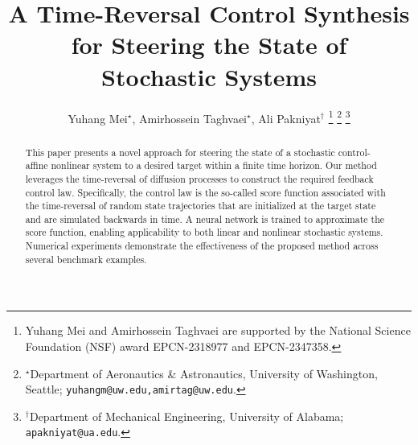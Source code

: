 \documentclass[letterpaper, 10 pt, conference]{ieeeconf}  %
\title{\LARGE \bf A Time-Reversal Control Synthesis for Steering the State of \\Stochastic Systems
}
\author{Yuhang Mei$^{\star}$, Amirhossein Taghvaei$^{\star}$, Ali Pakniyat$^{\dagger}$
 \thanks{Yuhang Mei and Amirhossein Taghvaei are supported by the National Science Foundation (NSF) award EPCN-2318977 and EPCN-2347358.}
     \thanks{$^\star$Department of Aeronautics \& Astronautics, University of Washington, Seattle; {\tt\small yuhangm@uw.edu,amirtag@uw.edu}.}   
	\thanks{$^\dagger$Department of Mechanical Engineering,
University of Alabama; {\tt\small apakniyat@ua.edu}.}
}
\begin{document}
	
	
	
      \maketitle
	 \thispagestyle{empty}
	 \pagestyle{empty}
	
	
    
        



        
	 \begin{abstract}
This paper presents a novel approach for steering the state of a stochastic control-affine nonlinear system to a desired target within a finite time horizon. Our method leverages the time-reversal of diffusion processes to construct the required feedback control law. Specifically, the control law is the so-called score function associated with the time-reversal of random state trajectories that are initialized at the target state and are simulated backwards in time.  A neural network is trained to approximate the score function, enabling applicability to both linear and nonlinear stochastic systems.  Numerical experiments demonstrate the effectiveness of the proposed method across several benchmark examples. 


	\end{abstract}

   
        

 
\end{document}
